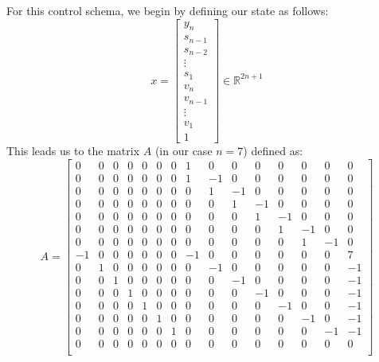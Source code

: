 \documentclass[12pt]{exam}
\begin{document}
\begin{questions}
\begin{solution}
\begin{enumerate}[label=(\alph*)]
\begin{itemize}
          For this control schema, we begin by defining our state as follows:
          \[
            x =
              \begin{bmatrix}
                y_n \\ s_{n-1} \\ s_{n-2} \\ \vdots \\ s_1 \\ v_n \\ v_{n-1} \\ \vdots \\ v_1 \\ 1
              \end{bmatrix} \in \mathbb{R}^{2n + 1}
          \]
          This leads us to the matrix $A$ (in our case $n = 7$) defined as:
          \[
            A =
              \begin{bmatrix}
                0 & 0 & 0 & 0 & 0 & 0 & 0 & 1 & 0 & 0 & 0 & 0 & 0 & 0 & 0 \\
                0 & 0 & 0 & 0 & 0 & 0 & 0 & 1 &-1 & 0 & 0 & 0 & 0 & 0 & 0 \\
                0 & 0 & 0 & 0 & 0 & 0 & 0 & 0 & 1 &-1 & 0 & 0 & 0 & 0 & 0 \\
                0 & 0 & 0 & 0 & 0 & 0 & 0 & 0 & 0 & 1 &-1 & 0 & 0 & 0 & 0 \\
                0 & 0 & 0 & 0 & 0 & 0 & 0 & 0 & 0 & 0 & 1 &-1 & 0 & 0 & 0 \\
                0 & 0 & 0 & 0 & 0 & 0 & 0 & 0 & 0 & 0 & 0 & 1 &-1 & 0 & 0 \\
                0 & 0 & 0 & 0 & 0 & 0 & 0 & 0 & 0 & 0 & 0 & 0 & 1 &-1 & 0 \\
               -1 & 0 & 0 & 0 & 0 & 0 & 0 &-1 & 0 & 0 & 0 & 0 & 0 & 0 & 7 \\
                0 & 1 & 0 & 0 & 0 & 0 & 0 & 0 &-1 & 0 & 0 & 0 & 0 & 0 &-1 \\
                0 & 0 & 1 & 0 & 0 & 0 & 0 & 0 & 0 &-1 & 0 & 0 & 0 & 0 &-1 \\
                0 & 0 & 0 & 1 & 0 & 0 & 0 & 0 & 0 & 0 &-1 & 0 & 0 & 0 &-1 \\
                0 & 0 & 0 & 0 & 1 & 0 & 0 & 0 & 0 & 0 & 0 &-1 & 0 & 0 &-1 \\
                0 & 0 & 0 & 0 & 0 & 1 & 0 & 0 & 0 & 0 & 0 & 0 &-1 & 0 &-1 \\
                0 & 0 & 0 & 0 & 0 & 0 & 1 & 0 & 0 & 0 & 0 & 0 & 0 &-1 &-1 \\
                0 & 0 & 0 & 0 & 0 & 0 & 0 & 0 & 0 & 0 & 0 & 0 & 0 & 0 & 0 \\

\end{bmatrix}\]
\end{itemize}
\end{enumerate}
\end{solution}
\end{questions}
\end{document}
